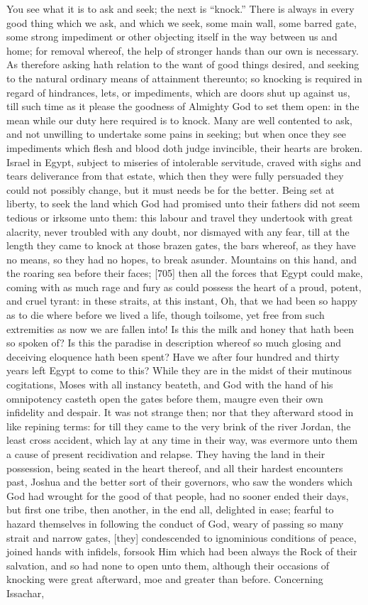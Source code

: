 You see what it is to ask and seek; the next is “knock.” There is always in every good thing which we ask, and which we seek, some main wall, some barred gate, some strong impediment or other objecting itself in the way between us and home; for removal whereof, the help of stronger hands than our own is necessary. As therefore asking hath relation to the want of good things desired, and seeking to the natural ordinary means of attainment thereunto; so knocking is required in regard of hindrances, lets, or impediments, which are doors shut up against us, till such time as it please the goodness of Almighty God to set them open: in the mean while our duty here required is to knock. Many are well contented to ask, and not unwilling to undertake some pains in seeking; but when once they see impediments which flesh and blood doth judge invincible, their hearts are broken. Israel in Egypt, subject to miseries of intolerable servitude, craved with sighs and tears deliverance from that estate, which then they were fully persuaded they could not possibly change, but it must needs be for the better. Being set at liberty, to seek the land which God had promised unto their fathers did not seem tedious or irksome unto them: this labour and travel they undertook with great alacrity, never troubled with any doubt, nor dismayed with any fear, till at the length they came to knock at those brazen gates, the bars whereof, as they have no means, so they had no hopes, to break asunder. Mountains on this hand, and the roaring sea before their faces; [705] then all the forces that Egypt could make, coming with as much rage and fury as could possess the heart of a proud, potent, and cruel tyrant: in these straits, at this instant, Oh, that we had been so happy as to die where before we lived a life, though toilsome, yet free from such extremities as now we are fallen into! Is this the milk and honey that hath been so spoken of? Is this the paradise in description whereof so much glosing and deceiving eloquence hath been spent? Have we after four hundred and thirty years left Egypt to come to this? While they are in the midst of their mutinous cogitations, Moses with all instancy beateth, and God with the hand of his omnipotency casteth open the gates before them, maugre even their own infidelity and despair. It was not strange then; nor that they afterward stood in like repining terms: for till they came to the very brink of the river Jordan, the least cross accident, which lay at any time in their way, was evermore unto them a cause of present recidivation and relapse. They having the land in their possession, being seated in the heart thereof, and all their hardest encounters past, Joshua and the better sort of their governors, who saw the wonders which God had wrought for the good of that people, had no sooner ended their days, but first one tribe, then another, in the end all, delighted in ease; fearful to hazard themselves in following the conduct of God, weary of passing so many strait and narrow gates, [they] condescended to ignominious conditions of peace, joined hands with infidels, forsook Him which had been always the Rock of their salvation, and so had none to open unto them, although their occasions of knocking were great afterward, moe and greater than before. Concerning Issachar, 